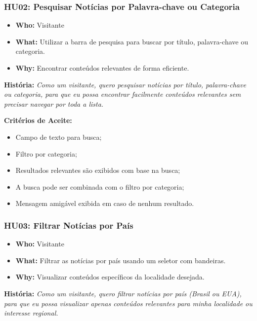 \subsubsection*{HU02: Pesquisar Notícias por Palavra-chave ou Categoria}

\begin{itemize}
  \item \textbf{Who:} Visitante
  \item \textbf{What:} Utilizar a barra de pesquisa para buscar por título, palavra-chave ou categoria.
  \item \textbf{Why:} Encontrar conteúdos relevantes de forma eficiente.
\end{itemize}

\noindent \textbf{História:} \textit{Como um visitante, quero pesquisar notícias por título, palavra-chave ou categoria, para que eu possa encontrar facilmente conteúdos relevantes sem precisar navegar por toda a lista.}

\noindent \textbf{Critérios de Aceite:}
\begin{itemize}
  \item Campo de texto para busca;
  \item Filtro por categoria;
  \item Resultados relevantes são exibidos com base na busca;
  \item A busca pode ser combinada com o filtro por categoria;
  \item Mensagem amigável exibida em caso de nenhum resultado.
\end{itemize}

\subsubsection*{HU03: Filtrar Notícias por País}

\begin{itemize}
  \item \textbf{Who:} Visitante
  \item \textbf{What:} Filtrar as notícias por país usando um seletor com bandeiras.
  \item \textbf{Why:} Visualizar conteúdos específicos da localidade desejada.
\end{itemize}

\noindent \textbf{História:} \textit{Como um visitante, quero filtrar notícias por país (Brasil ou EUA), para que eu possa visualizar apenas conteúdos relevantes para minha localidade ou interesse regional.}

